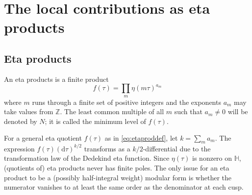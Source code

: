 \documentclass[11pt,a4paper]{amsart}
\theoremstyle{definition}
\newcommand{\SZ}{\mathbb{Z}}                    %
\begin{document}
\section{The local contributions as eta products}
\label{sec:locetaprod}

\subsection{Eta products}
An eta products is a finite product
\begin{equation} f(\tau)=\prod_m \eta(m \tau )^{a_m} 
\label{eq:etaproddef}
\end{equation}
where $m$ runs through a finite set of positive integers and the exponents
$a_m$ may take values from $\SZ$. The least common multiple of all $m$ such that $a_m\neq 0$ will be denoted by $N$; it is called the minimum level of $f(\tau)$.

For a general eta quotient $f(\tau)$ as in \eqref{eq:etaproddef}, let $k=\sum_m{a_m}$. The expression $f(\tau)(\mathrm{d}\tau)^{k/2}$ transforms as a $k/2$-differential due to the transformation law of the Dedekind eta function. Since $\eta(\tau)$ is nonzero on $\mathbb{H}$, (quotients of) eta products never has finite poles. The only issue for an eta product to be a (possibly half-integral weight) modular form is whether the numerator vanishes to at least the same order as the denominator at each cusp. 
\end{document}
